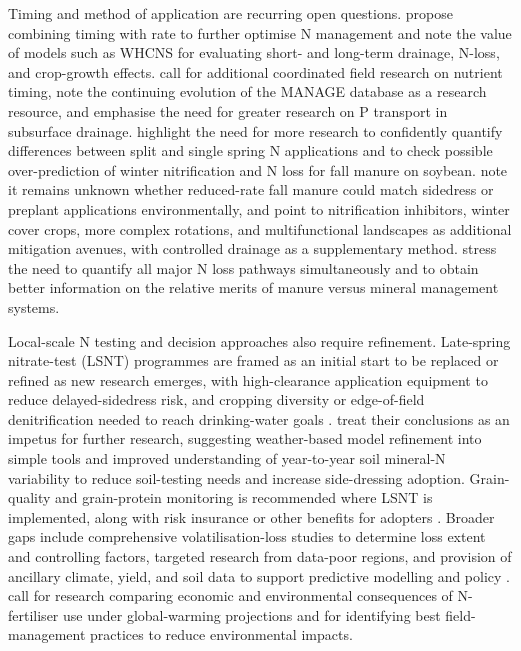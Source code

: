 \documentclass[11pt]{article}
\begin{document}
Timing and method of application are recurring open questions. \textcite{Liang2018} propose combining timing with rate to further optimise N management and note the value of models such as WHCNS for evaluating short- and long-term drainage, N-loss, and crop-growth effects. \textcite{Hertzberger2019} call for additional coordinated field research on nutrient timing, note the continuing evolution of the MANAGE database as a research resource, and emphasise the need for greater research on P transport in subsurface drainage. \textcite{Malone2007b} highlight the need for more research to confidently quantify differences between split and single spring N applications and to check possible over-prediction of winter nitrification and N loss for fall manure on soybean. \textcite{HernandezRamirez2011} note it remains unknown whether reduced-rate fall manure could match sidedress or preplant applications environmentally, and point to nitrification inhibitors, winter cover crops, more complex rotations, and multifunctional landscapes as additional mitigation avenues, with controlled drainage as a supplementary method. \textcite{Elmi2005} stress the need to quantify all major N loss pathways simultaneously and to obtain better information on the relative merits of manure versus mineral management systems.

Local-scale N testing and decision approaches also require refinement. Late-spring nitrate-test (LSNT) programmes are framed as an initial start to be replaced or refined as new research emerges, with high-clearance application equipment to reduce delayed-sidedress risk, and cropping diversity or edge-of-field denitrification needed to reach drinking-water goals \parencite{Jaynes2004}. \textcite{Malone2010} treat their conclusions as an impetus for further research, suggesting weather-based model refinement into simple tools and improved understanding of year-to-year soil mineral-N variability to reduce soil-testing needs and increase side-dressing adoption. Grain-quality and grain-protein monitoring is recommended where LSNT is implemented, along with risk insurance or other benefits for adopters \parencite{Karlen2005}. Broader gaps include comprehensive volatilisation-loss studies to determine loss extent and controlling factors, targeted research from data-poor regions, and provision of ancillary climate, yield, and soil data to support predictive modelling and policy \parencite{Chatterjee2020b}. \textcite{Haghnazari2020} call for research comparing economic and environmental consequences of N-fertiliser use under global-warming projections and for identifying best field-management practices to reduce environmental impacts.
\end{document}
